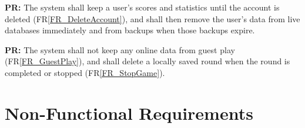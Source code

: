 \documentclass[12pt]{article}
\newcommand{\rref}[1]{FR\ref{#1}}
\newcounter{prnum} %
\begin{document}
\vspace{0.5em}
\noindent {}\label{PR_9}\textbf{PR\theprnum:} The system shall keep a user's scores and statistics until the account is deleted (\rref{FR_DeleteAccount}), and shall then remove the user's data from live databases immediately and from backups when those backups expire.
 
\vspace{0.5em}
\noindent {}\label{PR_10}\textbf{PR\theprnum:} The system shall not keep any online data from guest play (\rref{FR_GuestPlay}), and shall delete a locally saved round when the round is completed or stopped (\rref{FR_StopGame}).

\section{Non-Functional Requirements}





\end{document}

